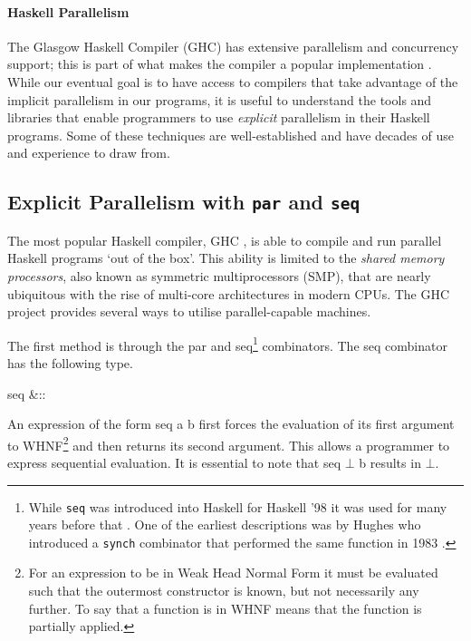 \paragraph{Haskell Parallelism}

The Glasgow Haskell Compiler (GHC) has extensive parallelism and concurrency
support; this is part of what makes the compiler a popular implementation
\citep{HistoryOfHaskell}. While our eventual goal is to have access to
compilers that take advantage of the implicit parallelism in our programs, it
is useful to understand the tools and libraries that enable programmers to use
\emph{explicit} parallelism in their Haskell programs. Some of these techniques
are well-established and have decades of use and experience to draw from.

\subsection{Explicit Parallelism with \texttt{par} and \texttt{seq}}
\label{sec:parAndSeq}

The most popular Haskell compiler, GHC \citep{HistoryOfHaskell}, is able to
compile and run parallel Haskell programs `out of the box'. This ability is
limited to the \emph{shared memory processors}, also known as symmetric
multiprocessors (SMP), that are nearly ubiquitous with the rise of multi-core
architectures in modern CPUs. The GHC project provides several ways to utilise
parallel-capable machines.

The first method is through the \<par\> and \<seq\>\footnote{While
\texttt{seq} was introduced into Haskell for Haskell '98 \citep{Haskell98Book}
it was used for many years before that \citep{HistoryOfHaskell}. One of the
earliest descriptions was by Hughes who introduced a \texttt{synch} combinator
that performed the same function in 1983 \citep{hughes:thesis}.} combinators.
The \<seq\> combinator has the following type.

\begin{haskell}
seq &:: \hasalpha \to \hasbeta \to \hasbeta
\end{haskell}

An expression of the form \<seq a b\> first forces the evaluation of its first
argument to WHNF\footnote{For an expression to be in Weak Head Normal Form it
must be evaluated such that the outermost constructor is known, but not
necessarily any further.  To say that a function is in WHNF means that the
function is partially applied.} and then returns its second argument. This
allows a programmer to express sequential evaluation. It is essential to note
that \<seq\> $\bot$ \<b\> results in $\bot$.

